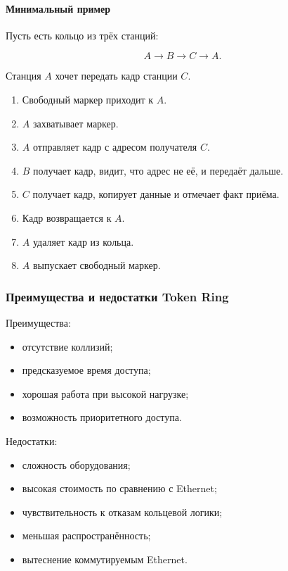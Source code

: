 \documentclass[12pt,a4paper]{article}
\begin{document}
\paragraph{Минимальный пример}

Пусть есть кольцо из трёх станций:

\[
A \rightarrow B \rightarrow C \rightarrow A.
\]

Станция $A$ хочет передать кадр станции $C$.

\begin{enumerate}
    \item Свободный маркер приходит к $A$.
    \item $A$ захватывает маркер.
    \item $A$ отправляет кадр с адресом получателя $C$.
    \item $B$ получает кадр, видит, что адрес не её, и передаёт дальше.
    \item $C$ получает кадр, копирует данные и отмечает факт приёма.
    \item Кадр возвращается к $A$.
    \item $A$ удаляет кадр из кольца.
    \item $A$ выпускает свободный маркер.
\end{enumerate}

\subsubsection{Преимущества и недостатки Token Ring}

Преимущества:
\begin{itemize}
    \item отсутствие коллизий;
    \item предсказуемое время доступа;
    \item хорошая работа при высокой нагрузке;
    \item возможность приоритетного доступа.
\end{itemize}

Недостатки:
\begin{itemize}
    \item сложность оборудования;
    \item высокая стоимость по сравнению с Ethernet;
    \item чувствительность к отказам кольцевой логики;
    \item меньшая распространённость;
    \item вытеснение коммутируемым Ethernet.
\end{itemize}
\end{document}
